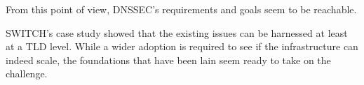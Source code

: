 \documentclass[a4paper,twocolumn]{scrartcl}
\begin{document}
From this point of view, DNSSEC's requirements and goals seem to be
reachable.

SWITCH's case study showed that the existing issues can be harnessed
at least at a TLD level. While a wider adoption is required to see if
the infrastructure can indeed scale, the foundations that have been
lain seem ready to take on the challenge.

\nocite{*}


\end{document}
